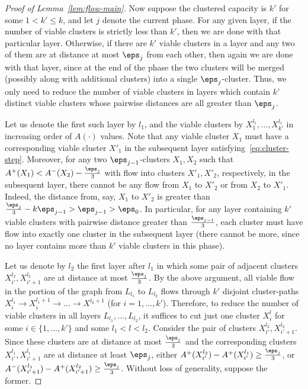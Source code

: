 \begin{proof}[Proof of Lemma~\ref{lem:flow-main}]
Now suppose the clustered capacity is $k'$ for some $1<k'\leq k$, and let $j$ denote the current phase. For any given layer, if the number of viable clusters is strictly less than $k'$, then we are done with that particular layer. Otherwise, if there are $k'$ viable clusters in a layer and any two of them are at distance at most $\eps_j$ from each other, then again we are done with that layer, since at the end of the phase the two clusters will be merged (possibly along with additional clusters) into a single $\eps_j$-cluster. Thus, we only need to reduce the number of viable clusters in layers which contain $k'$ distinct viable clusters whose pairwise distances are all greater than $\eps_j$.

Let us denote the first such layer by $l_1$, and the viable clusters by $X^{l_1}_1,\ldots,X^{l_1}_{k'}$ in increasing order of $A(\cdot)$ values. Note that any viable cluster $X_1$ must have a corresponding viable cluster $X'_1$ in the subsequent layer satisfying~\eqref{eq:cluster-step}. Moreover, for any two $\eps_{j-1}$-clusters $X_1,X_2$ such that $A^+(X_1)<A^-(X_2)-\frac{\eps_j}{3}$ with flow into clusters $X'_1,X'_2$, respectively, in the subsequent layer, there cannot be any flow from $X_1$ to $X'_2$ or from $X_2$ to $X'_1$. Indeed, the distance from, say,  $X_1$ to $X'_2$ is greater than $\frac{\eps_j}3-k\eps_{j-1}>\eps_{j-1}>\eps_0$. In particular, for any layer containing $k'$ viable clusters with pairwise distance greater than $\frac{\eps_{j-1}}3$, each cluster must have flow into exactly one cluster in the subsequent layer (there cannot be more, since no layer contains more than $k'$ viable clusters in this phase).

Let us denote by $l_2$ the first layer after $l_1$ in which some pair of adjacent clusters $X^{l_2}_{i'},X^{l_2}_{i'+1}$ are at distance at most $\frac{\eps_j}3$. By the above argument, all viable flow in the portion of the graph from $L_{l_1}$ to $L_{l_2}$ flows through $k'$ disjoint cluster-paths $X^{l_1}_i\rightarrow X^{l_1+1}_i\rightarrow\ldots\rightarrow X^{l_2+1}$ (for $i=1,\ldots,k'$). Therefore, to reduce the number of viable clusters in all layers $L_{l_1},\ldots,L_{l_2}$, it suffices to cut just one cluster $X^l_i$ for some $i\in\{1,\ldots,k'\}$ and some $l_1<l<l_2$. Consider the pair of clusters $X^{l_2}_{i'},X^{l_2}_{i'+1}$. Since these clusters are at distance at most $\frac{\eps_j}3$ and the corresponding clusters $X^{l_1}_{i'},X^{l_1}_{i'+1}$ are at distance at least $\eps_j$, either $A^+(X^{l_2}_{i'})-A^+(X^{l_1}_{i'})\geq\frac{\eps_j}3$, or $A^-(X^{l_1}_{i'+1})-A^+(X^{l_2}_{i'+1})\geq\frac{\eps_j}3$. Without loss of generality, suppose the former.


\end{proof}
